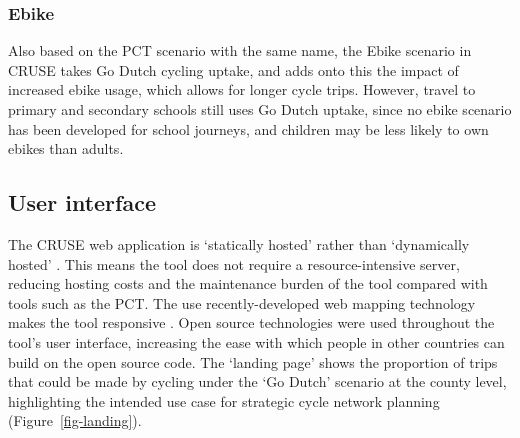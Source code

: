 \documentclass[
  super,
  preprint,
  3p]{elsarticle}
\begin{document}
\subsubsection{Ebike}\label{ebike}

Also based on the PCT scenario with the same name, the Ebike scenario in
CRUSE takes Go Dutch cycling uptake, and adds onto this the impact of
increased ebike usage, which allows for longer cycle trips. However,
travel to primary and secondary schools still uses Go Dutch uptake,
since no ebike scenario has been developed for school journeys, and
children may be less likely to own ebikes than adults.

\subsection{User interface}\label{sec-ui}

The CRUSE web application is `statically hosted' rather than
`dynamically hosted' \citep{wickham2021}. This means the tool does not
require a resource-intensive server, reducing hosting costs and the
maintenance burden of the tool compared with tools such as the PCT. The
use recently-developed web mapping technology makes the tool responsive
\citep{gonçalves2023}. Open source technologies were used throughout the
tool's user interface, increasing the ease with which people in other
countries can build on the open source code. The `landing page' shows
the proportion of trips that could be made by cycling under the `Go
Dutch' scenario at the county level, highlighting the intended use case
for strategic cycle network planning (Figure~\ref{fig-landing}).
\end{document}

